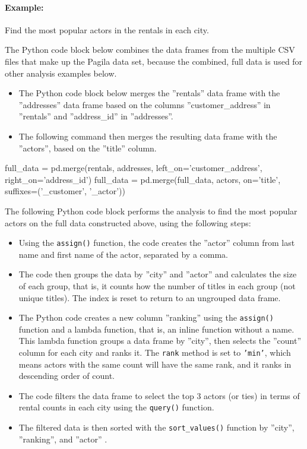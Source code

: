 \paragraph*{Example:} Find the most popular actors in the rentals in each city.

The Python code block below combines the data frames from the multiple CSV files that make up the Pagila data set, because the combined, full data is used for other analysis examples below.

\begin{itemize} 
\item The Python code block below merges the ''rentals'' data frame with the ''addresses'' data frame based on the columns ''customer\_address'' in ''rentals'' and ''address\_id'' in ''addresses''.
\item The following command then merges the resulting data frame with the ''actors'', based on the ''title'' column. 
\end{itemize}

\begin{pythoncode}
full_data = pd.merge(rentals, addresses, 
                     left_on='customer_address', 
                     right_on='address_id')
full_data = pd.merge(full_data, actors, on='title', 
                     suffixes=('_customer', '_actor'))
\end{pythoncode}

The following Python code block performs the analysis to find the most popular actors on the full data constructed above, using the following steps:

\begin{itemize}
\item Using the \texttt{assign()} function, the code creates the ''actor'' column from last name and first name of the actor, separated by a comma.
\item The code then groups the data by ''city'' and ''actor'' and calculates the size of each group, that is, it counts how the number of titles in each group (not unique titles). The index is reset to return to an ungrouped data frame.
\item The Python code creates a new column ''ranking'' using the \texttt{assign()} function and a lambda function, that is, an inline function without a name. This lambda function groups a data frame by ''city'', then selects the ''count'' column for each city and ranks it. The \texttt{rank} method is set to \texttt{'min'}, which means actors with the same count will have the same rank, and it ranks in descending order of count.
\item The code filters the data frame to select the top 3 actors (or ties) in terms of rental counts in each city using the \texttt{query()} function.
\item The filtered data is then sorted with the \texttt{sort\_values()} function by ''city'', ''ranking'', and ''actor'' .
\end{itemize}

